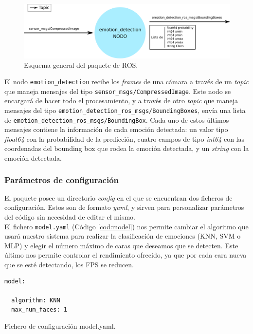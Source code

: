 \begin{figure} [h!]
  \begin{center}
    \includegraphics[width=15cm]{figs/paquete_ros.png}
  \end{center}
  \captionsetup{justification=centering}
  \caption{Esquema general del paquete de ROS.}
  \label{fig:esquema_paquete_ROS}
\end{figure}

El nodo \verb|emotion_detection| recibe los \textit{frames} de una cámara a través de un \textit{topic} que maneja mensajes del tipo \verb|sensor_msgs/CompressedImage|. Este nodo se encargará de hacer todo el procesamiento, y a través de otro \textit{topic} que maneja mensajes del tipo \verb|emotion_detection_ros_msgs/BoundingBoxes|, envía una lista de \verb|emotion_detection_ros_msgs/BoundingBox|. Cada uno de estos últimos mensajes contiene la información de cada emoción detectada: un valor tipo \textit{float64} con la probabilidad de la predicción, cuatro campos de tipo \textit{int64} con las coordenadas del bounding box que rodea la emoción detectada, y un \textit{string} con la emoción detectada.

\subsubsection{Parámetros de configuración}

El paquete posee un directorio \textit{config} en el que se encuentran dos ficheros de configuración. Estos son de formato \textit{yaml}, y sirven para personalizar parámetros del código sin necesidad de editar el mismo.\\

El fichero \verb|model.yaml| (Código \ref{cod:model}) nos permite cambiar el algoritmo que usará nuestro sistema para realizar la clasificación de emociones (KNN, SVM o MLP) y elegir el número máximo de caras que deseamos que se detecten. Este último nos permite controlar el rendimiento ofrecido, ya que por cada cara nueva que se esté detectando, los FPS se reducen.\\

\begin{code}[h]
\begin{lstlisting}
model:

  algorithm: KNN
  max_num_faces: 1
\end{lstlisting}
\captionsetup{justification=centering}
\caption[Fichero de configuración model.yaml.]{Fichero de configuración model.yaml.}
\label{cod:model}
\end{code}

